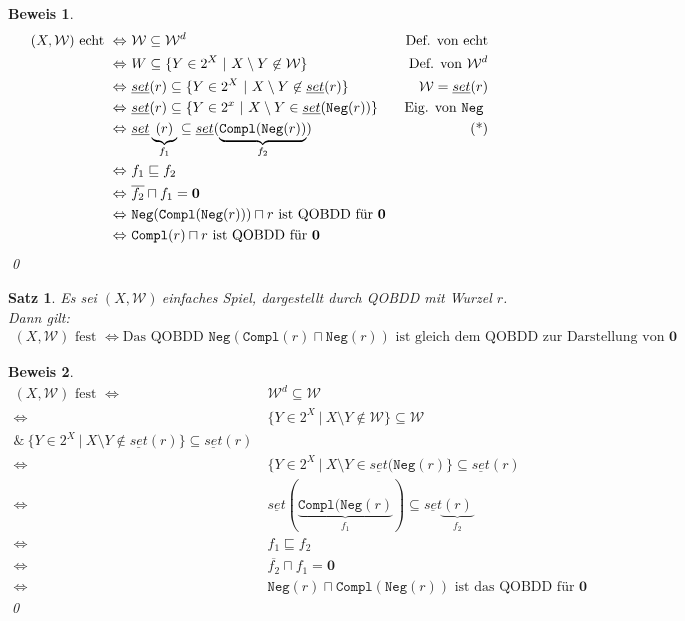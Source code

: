 \documentclass[ngerman]{scrartcl}
\theoremstyle{custom}
\newtheorem{ms}[mdef]{Satz}
\newtheorem*{bw}{Beweis}
\newcommand{\0}{\mathbf{0}}
\newcommand{\1}{\mathbf{L}}
\newcommand{\set}{\underline{set}}
\newcommand{\sg}{$(X,\mathcal{W})~$}
\newcommand{\W}{\mathcal{W}}
\begin{document}
\begin{bw}
\begin{align*}
(X,\W) \text{ echt } \Leftrightarrow&~ \W \subseteq \W^d & \text{
  Def. von echt}\\
\Leftrightarrow&~ W \subseteq \{Y \in 2^X ~|~ X \setminus Y \not \in
\W\} & \text{ Def. von } \W^d\\
\Leftrightarrow&~ \set(r) \subseteq \{Y \in 2^X ~|~ X \setminus Y \not
\in \set(r)\} & \W = \set(r)\\
\Leftrightarrow&~ \set(r) \subseteq \{Y \in 2^x ~|~ X \setminus Y \in
\set(\texttt{Neg}(r))\} & \text{ Eig. von \texttt{Neg} }\\
\Leftrightarrow&~ \set\underbrace{(r)}_{f_1} \subseteq
\set(\underbrace{\texttt{Compl}(\texttt{Neg}(r))}_{f_2}) &
\text{(*)}\\
\Leftrightarrow&~ f_1 \sqsubseteq f_2 \\
\Leftrightarrow&~ \overline{f_2} \sqcap f_1 = \0\\
\Leftrightarrow&~ \texttt{Neg}(\texttt{Compl}(\texttt{Neg}(r))) \sqcap
r \text{ ist QOBDD f\"ur } \0\\
\Leftrightarrow&~ \texttt{Compl}(r) \sqcap r \text{ ist QOBDD f\"ur } \0
\end{align*}
\qed
\end{bw}

\begin{ms}
Es sei \sg einfaches Spiel, dargestellt durch QOBDD mit Wurzel
$r$. Dann gilt:
\begin{align*}
(X,\W) \text{ fest } \Leftrightarrow \text{Das QOBDD }
\texttt{Neg}(\texttt{Compl}(r) \sqcap \texttt{Neg}(r)) \text{ ist gleich
  dem QOBDD zur Darstellung von } \0
\end{align*}
\end{ms}

\begin{bw}
\begin{align*}
(X,\W) \text{ fest } \Leftrightarrow&~ \W^d \subseteq \W \\
\Leftrightarrow&~ \{Y \in 2^X ~|~ X \setminus Y \not \in \W \}
\subseteq \W\\
\&~ \{Y \in 2^X ~|~ X \setminus Y \not \in \set(r) \}
\subseteq \set(r)\\
\Leftrightarrow&~ \{Y \in 2^X ~|~ X \setminus Y \in
\set(\texttt{Neg} (r)\} \subseteq \set(r)\\
\Leftrightarrow&~
\set(\underbrace{\texttt{Compl}(\texttt{Neg}(r)}_{f_1})
\subseteq \set\underbrace{(r)}_{f_2}\\
\Leftrightarrow&~ f_1 \sqsubseteq f_2\\
\Leftrightarrow&~ \overline{f_2} \sqcap f_1 = \0\\
\Leftrightarrow&~ \texttt{Neg}(r) \sqcap
\texttt{Compl}(\texttt{Neg}(r)) \text{ ist das QOBDD f\"ur } \0
\end{align*}
\qed
\end{bw}
\end{document}
